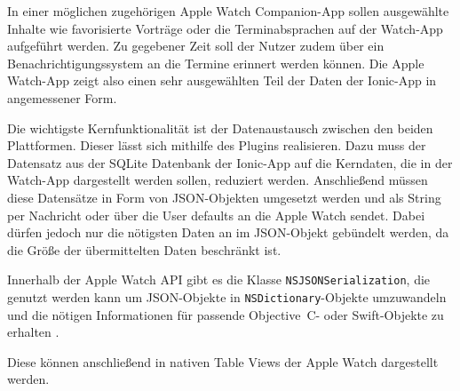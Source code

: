 In einer möglichen zugehörigen Apple Watch Companion-App sollen ausgewählte Inhalte wie favorisierte Vorträge oder die Terminabsprachen auf der Watch-App aufgeführt werden. Zu gegebener Zeit soll der Nutzer zudem über ein Benachrichtigungssystem an die Termine erinnert werden können. Die Apple Watch-App zeigt also einen sehr ausgewählten Teil der Daten der Ionic-App in angemessener Form.

Die wichtigste Kernfunktionalität ist der Datenaustausch zwischen den beiden Plattformen.
Dieser lässt sich mithilfe des Plugins realisieren. Dazu muss der Datensatz aus der SQLite Datenbank der Ionic-App auf die Kerndaten, die in der Watch-App dargestellt werden sollen, reduziert werden. Anschließend müssen diese Datensätze in Form von JSON-Objekten umgesetzt werden und als String per Nachricht oder über die User defaults an die Apple Watch sendet. Dabei dürfen jedoch nur die nötigsten Daten an im JSON-Objekt gebündelt werden, da die Größe der übermittelten Daten beschränkt ist.

Innerhalb der Apple Watch API gibt es die Klasse \texttt{NSJSONSerialization}, die genutzt werden kann um JSON-Objekte in \texttt{NSDictionary}-Objekte umzuwandeln und die nötigen Informationen für passende Objective~C- oder Swift-Objekte zu erhalten \cite{appleDokuJSONSerialization}. 

Diese können anschließend in nativen Table Views der Apple Watch dargestellt werden.
